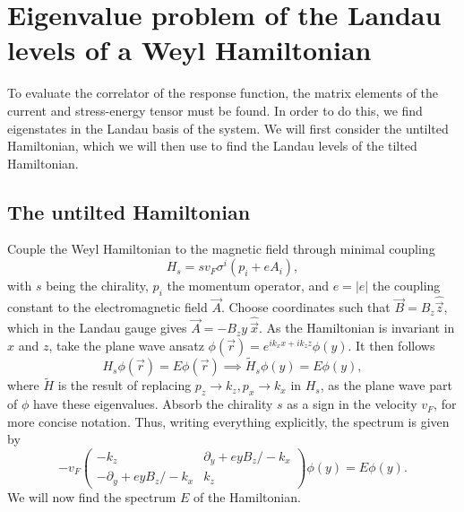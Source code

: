 \section{Eigenvalue problem of the Landau levels of a Weyl Hamiltonian}
To evaluate the correlator of the response function, the matrix elements of the current and stress-energy tensor must be found.
In order to do this, we find eigenstates in the Landau basis of the system.
We will first consider the untilted Hamiltonian, which we will then use to find the Landau levels of the tilted Hamiltonian.

\subsection{The untilted Hamiltonian}
\label{sec:ll-notilt}
Couple the Weyl Hamiltonian to the magnetic field through minimal coupling
\begin{equation}
  \label{eq:weyl-hamil}
  H_s = s v_F \sigma^i \left( p_i + e A_i \right),
\end{equation}
with $s$ being the chirality, $p_i$ the momentum operator, and $e = |e|$ the coupling constant to the electromagnetic field $\vec{A}$.
Choose coordinates such that $\vec{B} = B_z \hat{\vec{z}}$, which in the Landau gauge gives $\vec{A} = -B_{z}y \: \hat{\vec{x}}$.
As the Hamiltonian is invariant in $x$ and $z$, take the plane wave ansatz $\phi(\vec{r}) = e^{ik_x x + i k_z z} \phi (y)$.
It then follows
\begin{equation}
  H_s \phi(\vec{r}) = E \phi(\vec{r}) \implies \tilde{H}_s \phi(y)  = E \phi(y),
\end{equation}
where $\tilde{H}$ is the result of replacing $p_z \to  k_z, p_x\to   k_x$ in $H_s$, as the plane wave part of $\phi $ have these eigenvalues.
Absorb the chirality $s$ as a sign in the velocity $v_F$, for more concise notation.
Thus, writing everything explicitly, the spectrum is given by
\begin{equation}
  \label{eq:25}
  -  v_F
  \begin{pmatrix}
    - k_z & \partial _y + e y B_{z} /   - k_x\\
    -\partial _y + e y B_{z} /  -k_x & k_z
  \end{pmatrix}
  \phi(y)  = E\phi(y).
\end{equation}
We will now find the spectrum $E$ of the Hamiltonian.

